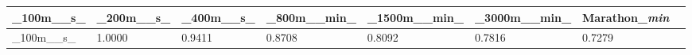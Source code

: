 \documentclass[11pt]{article}
\begin{document}
    \begin{longtable}[]{@{}llllllll@{}}
\toprule
\begin{minipage}[b]{0.10\columnwidth}\raggedright
\_100m\_\_s\_\strut
\end{minipage} & \begin{minipage}[b]{0.10\columnwidth}\raggedright
\_200m\_\_s\_\strut
\end{minipage} & \begin{minipage}[b]{0.10\columnwidth}\raggedright
\_400m\_\_s\_\strut
\end{minipage} & \begin{minipage}[b]{0.10\columnwidth}\raggedright
\_800m\_\_min\_\strut
\end{minipage} & \begin{minipage}[b]{0.10\columnwidth}\raggedright
\_1500m\_\_min\_\strut
\end{minipage} & \begin{minipage}[b]{0.10\columnwidth}\raggedright
\_3000m\_\_min\_\strut
\end{minipage} & \begin{minipage}[b]{0.10\columnwidth}\raggedright
Marathon\_\emph{min}\strut
\end{minipage} & \begin{minipage}[b]{0.10\columnwidth}\raggedright
\strut
\end{minipage}\tabularnewline
\midrule
\endhead
\begin{minipage}[t]{0.10\columnwidth}\raggedright
\_100m\_\_s\_\strut
\end{minipage} & \begin{minipage}[t]{0.10\columnwidth}\raggedright
1.0000\strut
\end{minipage} & \begin{minipage}[t]{0.10\columnwidth}\raggedright
0.9411\strut
\end{minipage} & \begin{minipage}[t]{0.10\columnwidth}\raggedright
0.8708\strut
\end{minipage} & \begin{minipage}[t]{0.10\columnwidth}\raggedright
0.8092\strut
\end{minipage} & \begin{minipage}[t]{0.10\columnwidth}\raggedright
0.7816\strut
\end{minipage} & \begin{minipage}[t]{0.10\columnwidth}\raggedright
0.7279\strut
\end{minipage} & \begin{minipage}[t]{0.10\columnwidth}\raggedright

\end{minipage}
\end{longtable}
\end{document}
